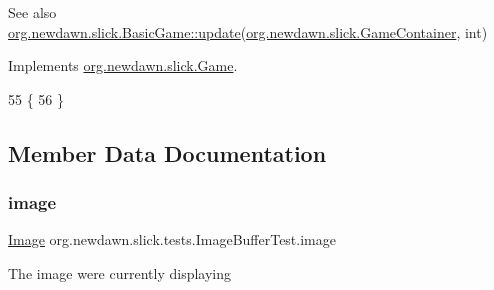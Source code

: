 \begin{DoxySeeAlso}{See also}
\mbox{\hyperlink{classorg_1_1newdawn_1_1slick_1_1_basic_game_acfe6fa05aef83bff1631af91a3e4bd20}{org.\+newdawn.\+slick.\+Basic\+Game\+::update}}(\mbox{\hyperlink{classorg_1_1newdawn_1_1slick_1_1_game_container}{org.\+newdawn.\+slick.\+Game\+Container}}, int) 
\end{DoxySeeAlso}


Implements \mbox{\hyperlink{interfaceorg_1_1newdawn_1_1slick_1_1_game_ab07b2e9463ee4631620dde0de25bdee8}{org.\+newdawn.\+slick.\+Game}}.


\begin{DoxyCode}
55                                                            \{
56     \}
\end{DoxyCode}


\subsection{Member Data Documentation}
\mbox{\label{classorg_1_1newdawn_1_1slick_1_1tests_1_1_image_buffer_test_afde40a9c63dc29ce4951b86e0a721c8a}} 
\subsubsection{\texorpdfstring{image}{image}}
{\footnotesize\ttfamily \mbox{\hyperlink{classorg_1_1newdawn_1_1slick_1_1_image}{Image}} org.\+newdawn.\+slick.\+tests.\+Image\+Buffer\+Test.\+image\hspace{0.3cm}{\ttfamily [private]}}

The image we\textquotesingle{}re currently displaying 